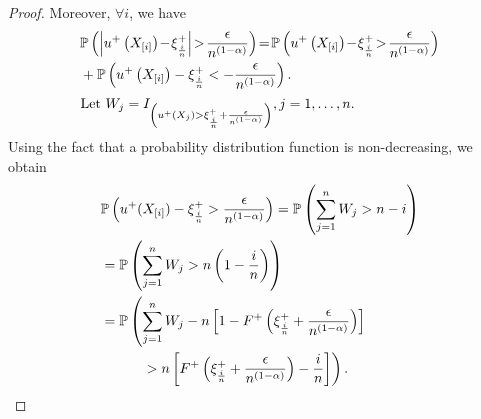 \begin{proof}
Moreover, $\forall i$, we have
\begin{align*}
& \Prob{ \left | u^+\left(X_{[i]}\right)\! -\! \xi^+_{\frac{i}{n}} \right | \!>\! \frac {\epsilon} {n^{\left(1-\alpha\right)}}}  
 \!=\! \Prob{
    u^+\left(X_{[i]}\right) \!-\! \xi^+_{\frac{i}{n}} \!>\! \frac {\epsilon} {n^{\left(1-\alpha\right)}}}\\
	&	+ \Prob{ u^+\left(X_{[i]}\right) -
    \xi^+_{\frac{i}{n}} < - \frac {\epsilon} {n^{\left(1-\alpha\right)}}}.
\end{align*} 
$$\hspace{-6em}\text{Let } W_j = I_{\left(u^+(X_j) > \xi^+_{\frac{i}{n}} + \frac{\epsilon}{n^{(1-\alpha)}}\right)}, j=1, \ldots,n.$$ Using the fact that a probability distribution function is non-decreasing, we obtain 
\begin{align*}
& \mathbb{P}\left(  u^+(X_{[i]}) - \xi^+_{\frac{i}{n}} > \frac {\epsilon}{n^{(1-\alpha)}} \right) =\mathbb{P}\left(  \sum _{j=1}^{n} W_j > n - i \right)  \\
& = \mathbb{P}\left(  \sum _{j=1}^{n} W_j > n\left(1-\frac{i}{n}\right) \right) \\ 
& = \mathbb{P} \left( \sum _{j=1}^{n} W_j - n  \left[1-F^{+}\left(\xi^+_{\frac{i}{n}}
+\frac{\epsilon}{n^{(1-\alpha)}}\right)\right] \right. \\
&\left.\quad\qquad> n  \left[F^{+}\left(\xi^+_{\frac{i}{n}} +\frac{\epsilon}{n^{(1-\alpha)}}\right)
- \frac{i}{n}\right]\right).
\end{align*}


\end{proof}
